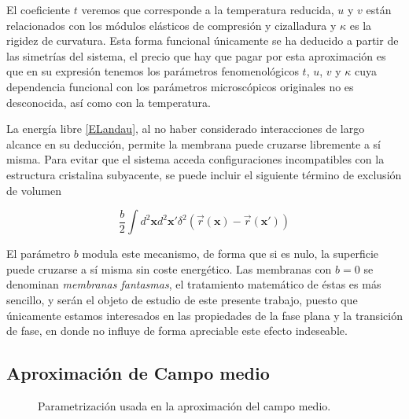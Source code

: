 El coeficiente $t$ veremos que corresponde a la temperatura reducida, $u$ y $v$ están
relacionados con los módulos elásticos de compresión y cizalladura y $\kappa$
es la rigidez de curvatura. Esta forma funcional únicamente se ha deducido a
partir de las simetrías del sistema, el precio que hay que pagar por esta aproximación es que en su
expresión tenemos los parámetros fenomenológicos $t$, $u$, $v$ y $\kappa$ cuya
dependencia funcional con los parámetros microscópicos originales no es
desconocida, así como con la temperatura.


La energía libre \eqref{ELandau}, al no haber considerado
interacciones de largo alcance en su deducción, permite la membrana puede
cruzarse libremente a sí misma. Para evitar que el sistema acceda
configuraciones incompatibles con la estructura cristalina subyacente, se
puede incluir el siguiente término de exclusión de volumen

\begin{equation*}
\frac{b}{2}\int d^2\mathbf{x} d^2\mathbf{x'}
\delta^2(\vec{r}(\mathbf{x})-\vec{r}(\mathbf{x'}))
\end{equation*}

El parámetro $b$ modula este mecanismo, de forma que si es nulo, la superficie
puede cruzarse a sí misma sin coste energético. Las membranas con $b=0$ se
denominan \textit{membranas fantasmas}, el tratamiento matemático de éstas es
 más sencillo, y serán el objeto de estudio de este presente
trabajo, puesto que únicamente estamos interesados en las propiedades de la
fase plana y la transición de fase, en donde no influye de forma apreciable
este efecto indeseable. 

\subsection{Aproximación de Campo medio}\label{campo_medio}

\begin{figure}[h]
\centering
 \resizebox{\columnwidth}{!}{}
\caption{Parametrización usada en la aproximación del campo medio.}\label{campo-medio-fig}
\end{figure}

